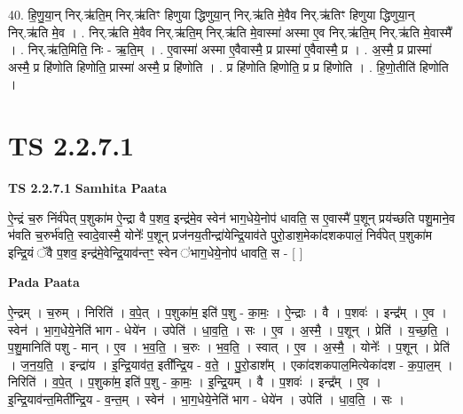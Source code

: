 \documentclass[17pt]{extarticle}
\begin{document}
40. हि॒णु॒या॒न् निर्.ऋ॑ति॒म् निर्.ऋ॑तिꣳ हिणुया द्धिणुया॒न् निर्.ऋ॑ति मे॒वैव निर्.ऋ॑तिꣳ हिणुया द्धिणुया॒न् निर्.ऋ॑ति मे॒व । . निर्.ऋ॑ति मे॒वैव निर्.ऋ॑ति॒म् निर्.ऋ॑ति मे॒वास्मा॑ अस्मा ए॒व निर्.ऋ॑ति॒म् निर्.ऋ॑ति मे॒वास्मै᳚ । . निर्.ऋ॑ति॒मिति॒ निः - ऋ॒ति॒म् । . ए॒वास्मा॑ अस्मा ए॒वैवास्मै॒ प्र प्रास्मा॑ ए॒वैवास्मै॒ प्र । . अ॒स्मै॒ प्र प्रास्मा॑ अस्मै॒ प्र हि॑णोति हिणोति॒ प्रास्मा॑ अस्मै॒ प्र हि॑णोति । . प्र हि॑णोति हिणोति॒ प्र प्र हि॑णोति । . हि॒णो॒तीति॑ हिणोति । \newline
\pagebreak
{}

\section{ TS 2.2.7.1 }

\textbf{TS 2.2.7.1 } \newline
\textbf{Samhita Paata} \newline

ऐ॒न्द्रं च॒रु निंर्व॑पेत् प॒शुका॑म ऐ॒न्द्रा वै प॒शव॒ इन्द्र॑मे॒व स्वेन॑ भाग॒धेये॒नोप॑ धावति॒ स ए॒वास्मै॑ प॒शून् प्रय॑च्छति पशु॒माने॒व भ॑वति च॒रुर्भ॑वति॒ स्वादे॒वास्मै॒ योनेः᳚ प॒शून् प्रज॑नय॒तीन्द्रा॑येन्द्रि॒याव॑ते पुरो॒डाश॒मेका॑दशकपालं॒ निर्व॑पेत् प॒शुका॑म इन्द्रि॒यं ॅवै प॒शव॒ इन्द्र॑मे॒वेन्द्रि॒याव॑न्तꣳ॒॒ स्वेन ॑भाग॒धेये॒नोप॑ धावति॒ स - [  ] \newline

\textbf{Pada Paata} \newline

ऐ॒न्द्रम् । च॒रुम् । निरिति॑ । व॒पे॒त् । प॒शुका॑म॒ इति॑ प॒शु - का॒मः॒ । ऐ॒न्द्राः । वै । प॒शवः॑ । इन्द्र᳚म् । ए॒व । स्वेन॑ । भा॒ग॒धेये॒नेति॑ भाग - धेये॑न । उपेति॑ । धा॒व॒ति॒ । सः । ए॒व । अ॒स्मै॒ । प॒शून् । प्रेति॑ । य॒च्छ॒ति॒ । प॒शु॒मानिति॑ पशु - मान् । ए॒व । भ॒व॒ति॒ । च॒रुः । भ॒व॒ति॒ । स्वात् । ए॒व । अ॒स्मै॒ । योनेः᳚ । प॒शून् । प्रेति॑ । ज॒न॒य॒ति॒ । इन्द्रा॑य । इ॒न्द्रि॒याव॑त॒ इती᳚न्द्रि॒य - व॒ते॒ । पु॒रो॒डाश᳚म् । एका॑दशकपाल॒मित्येका॑दश - क॒पा॒ल॒म् । निरिति॑ । व॒पे॒त् । प॒शुका॑म॒ इति॑ प॒शु - का॒मः॒ । इ॒न्द्रि॒यम् । वै । प॒शवः॑ । इन्द्र᳚म् । ए॒व । इ॒न्द्रि॒याव॑न्त॒मिती᳚न्द्रि॒य - व॒न्त॒म् । स्वेन॑ । भा॒ग॒धेये॒नेति॑ भाग - धेये॑न । उपेति॑ । धा॒व॒ति॒ । सः ।  \newline
\end{document}
